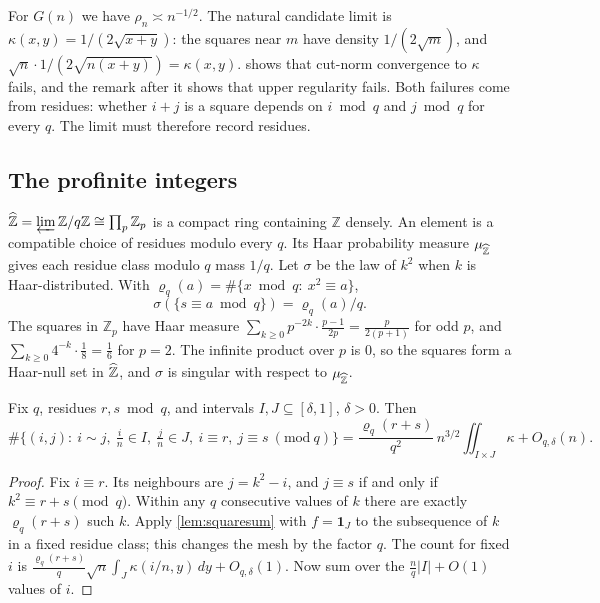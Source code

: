 For $G(n)$ we have $\rho_n\asymp n^{-1/2}$. The natural candidate limit is $\kappa(x,y)=1/(2\sqrt{x+y})$:
the squares near $m$ have density $1/(2\sqrt m)$, and
$\sqrt n\cdot 1/(2\sqrt{n(x+y)})=\kappa(x,y)$.  shows that cut-norm
convergence to $\kappa$ fails, and the remark after it shows that upper regularity fails.
Both failures come from residues: whether $i+j$ is a square depends on $i\bmod q$ and
$j\bmod q$ for every $q$. The limit must therefore record residues.

\subsection{The profinite integers}
$\widehat{\mathbb{Z}}=\varprojlim\mathbb{Z}/q\mathbb{Z}\cong\prod_p\mathbb{Z}_p$ is a compact ring
containing $\mathbb{Z}$ densely. An element is a compatible choice of residues modulo every
$q$. Its Haar probability measure $\mu_{\widehat{\mathbb{Z}}}$ gives each residue class modulo $q$ mass
$1/q$. Let $\sigma$ be the law of $k^2$ when $k$ is Haar-distributed. With
$\varrho_q(a)=\#\{x\bmod q:\ x^2\equiv a\}$,
\[
\sigma(\{s\equiv a\bmod q\})=\varrho_q(a)/q .
\]
The squares in $\mathbb{Z}_p$ have Haar measure $\sum_{k\ge0}p^{-2k}\cdot\frac{p-1}{2p}=\frac{p}{2(p+1)}$
for odd $p$, and $\sum_{k\ge0}4^{-k}\cdot\frac18=\frac16$ for $p=2$. The infinite
product over $p$ is $0$, so the squares form a Haar-null set in $\widehat{\mathbb{Z}}$, and $\sigma$
is singular with respect to $\mu_{\widehat{\mathbb{Z}}}$.

\begin{proposition}\label{prop:equid}
Fix $q$, residues $r,s\bmod q$, and intervals $I,J\subseteq[\delta,1]$, $\delta>0$. Then
\[
\#\bigl\{(i,j):\ i\sim j,\ \tfrac in\in I,\ \tfrac jn\in J,\ i\equiv r,\ j\equiv s\ (\mathrm{mod}\ q)\bigr\}
=\frac{\varrho_q(r+s)}{q^2}\,n^{3/2}\!\iint_{I\times J}\kappa+O_{q,\delta}(n).
\]
\end{proposition}

\begin{proof}
Fix $i\equiv r$. Its neighbours are $j=k^2-i$, and $j\equiv s$ if and only if
$k^2\equiv r+s\pmod q$. Within any $q$ consecutive values of $k$ there are exactly
$\varrho_q(r+s)$ such $k$. Apply \cref{lem:squaresum} with $f=\mathbf 1_J$ to the
subsequence of $k$ in a fixed residue class; this changes the mesh by the factor $q$.
The count for fixed $i$ is $\frac{\varrho_q(r+s)}q\sqrt n\int_J\kappa(i/n,y)\,dy+O_{q,\delta}(1)$.
Now sum over the $\frac nq|I|+O(1)$ values of $i$.
\end{proof}

